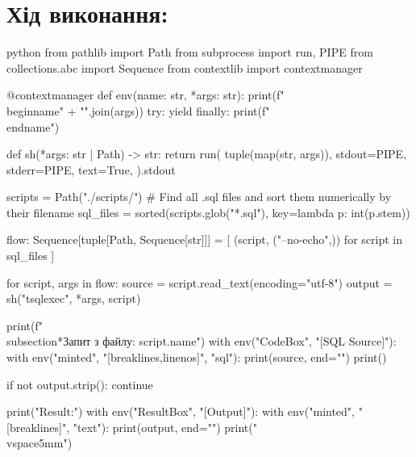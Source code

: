 \documentclass{article}
\begin{document}
    \section*{Хід виконання:}
    \begin{sciffi}{python}
        from pathlib import Path
        from subprocess import run, PIPE
        from collections.abc import Sequence
        from contextlib import contextmanager
        
        @contextmanager
        def env(name: str, *args: str):
            print(f"\\begin{{{name}}}" + "".join(args))
            try:
                yield
            finally:
                print(f"\\end{{{name}}}")

        def sh(*args: str | Path) -> str:
            return run(
                tuple(map(str, args)),
                stdout=PIPE,
                stderr=PIPE,
                text=True,
            ).stdout

        scripts = Path("./scripts/")
        # Find all .sql files and sort them numerically by their filename
        sql_files = sorted(scripts.glob("*.sql"), key=lambda p: int(p.stem))

        flow: Sequence[tuple[Path, Sequence[str]]] = [
            (script, ("--no-echo",)) for script in sql_files
        ]

        for script, args in flow:
            source = script.read_text(encoding="utf-8")
            output = sh("tsqlexec", *args, script)

            print(f"\\subsection*{{Запит з файлу: {script.name}}}")
            with env("CodeBox", "[SQL Source]"):
                with env("minted", "[breaklines,linenos]", "{sql}"):
                    print(source, end="")
            print()

            if not output.strip():
                continue

            print("Result:")
            with env("ResultBox", "[Output]"):
                with env("minted", "[breaklines]", "{text}"):
                    print(output, end="")
            print("\\vspace{5mm}")

    \end{sciffi}

    \newpage
\end{document}
